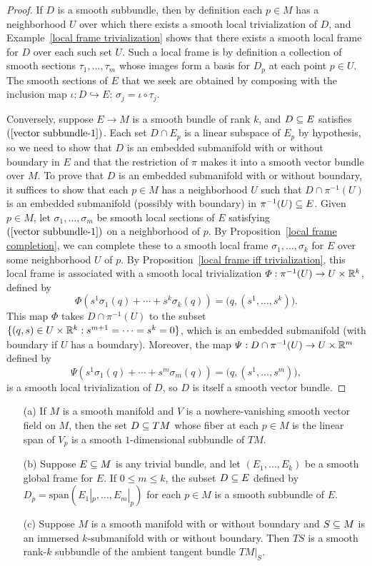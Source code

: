 \begin{proof}
If $D$ is a smooth subbundle, then by definition each $p\in M$ has a neighborhood $U$ over which there exists a smooth local trivialization of $D$, and Example~\ref{local frame trivialization} shows that there exists a smooth local frame for $D$ over each such set $U$. Such a local frame is by definition a collection of smooth sections $\tau_1,\dots,\tau_m$ whose images form a basis for $D_p$ at each point $p\in U$. The smooth sections of $E$ that we seek are obtained by composing with the inclusion map $\iota:D\hookrightarrow E$: $\sigma_j=\iota\circ\tau_j$.\par
Conversely, suppose $E\to M$ is a smooth bundle of rank $k$, and $D\subseteq E$ satisfies $(\ref{vector subbundle-1})$. Each set $D\cap E_p$ is a linear subspace of $E_p$ by hypothesis, so we need to show that $D$ is an embedded submanifold with or without boundary in $E$ and that the restriction of $\pi$ makes it into a smooth vector bundle over $M$. To prove that $D$ is an embedded submanifold with or without boundary, it suffices to show that each $p\in M$ has a neighborhood $U$ such that $D\cap\pi^{-1}(U)$ is an embedded submanifold (possibly with boundary) in $\pi^{-1}(U)\subseteq E$. Given $p\in M$, let $\sigma_1,\dots,\sigma_m$ be smooth local sections of $E$ satisfying $(\ref{vector subbundle-1})$ on a neighborhood of $p$. By Proposition~\ref{local frame completion}, we can complete these to a smooth local frame $\sigma_1,\dots,\sigma_k$ for $E$ over some neighborhood $U$ of $p$. By Proposition~\ref{local frame iff trivialization}, this local frame is associated with a smooth local trivialization $\varPhi:\pi^{-1}(U)\to U\times\mathbb{R}^k$, defined by
\[\varPhi(s^1\sigma_1(q)+\cdots+s^k\sigma_k(q))=\big(q,(s^1,\dots,s^k)\big).\]
This map $\varPhi$ takes $D\cap\pi^{-1}(U)$ to the subset $\{(q,s)\in U\times\mathbb{R}^k:s^{m+1}=\cdots=s^k=0\}$, which is an embedded submanifold (with boundary if $U$ has a boundary). Moreover, the map $\varPsi:D\cap\pi^{-1}(U)\to U\times\mathbb{R}^m$ defined by
\[\varPsi(s^1\sigma_1(q)+\cdots+s^m\sigma_m(q))=\big(q,(s^1,\dots,s^m)\big),\]
is a smooth local trivialization of $D$, so $D$ is itself a smooth vector bundle.
\end{proof}
\begin{example}
\mbox{}
\begin{itemize}
\item[(a)] If $M$ is a smooth manifold and $V$ is a nowhere-vanishing smooth vector field on $M$, then the set $D\subseteq TM$ whose fiber at each $p\in M$ is the linear span of $V_p$ is a smooth $1$-dimensional subbundle of $TM$.
\item[(b)] Suppose $E\subseteq M$ is any trivial bundle, and let $(E_1,\dots,E_k)$ be a smooth global frame for $E$. If $0\leq m\leq k$, the subset $D\subseteq E$ defined by $D_p=\mathrm{span}(E_1|_p,\dots,E_m|_p)$ for each $p\in M$ is a smooth subbundle of $E$.
\item[(c)] Suppose $M$ is a smooth manifold with or without boundary and $S\subseteq M$ is an immersed $k$-submanifold with or without boundary. Then $TS$ is a smooth rank-$k$ subbundle of the ambient tangent bundle $TM|_S$.
\end{itemize}
\end{example}
